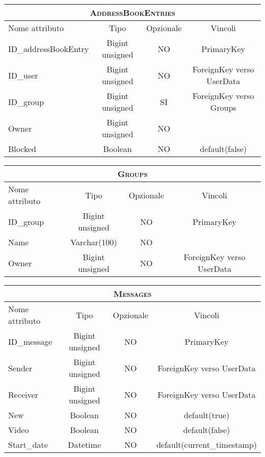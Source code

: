 \begin{center}
\bigskip

\begin{tabular}{lccc}
\toprule
\multicolumn{4}{c}{\scshape\bfseries AddressBookEntries}\\
\midrule
Nome attributo & Tipo & Opzionale & Vincoli\\
\midrule
ID\_addressBookEntry & Bigint unsigned & NO & PrimaryKey\\
ID\_user & Bigint unsigned & NO & ForeignKey verso UserData\\
ID\_group & Bigint unsigned & SI & ForeignKey verso Groups\\
Owner & Bigint unsigned & NO & \\
Blocked & Boolean & NO & default(false)\\
\bottomrule
\end{tabular}

\bigskip

\begin{tabular}{lccc}
\toprule
\multicolumn{4}{c}{\scshape\bfseries Groups}\\
\midrule
Nome attributo & Tipo & Opzionale & Vincoli\\
\midrule
ID\_group & Bigint unsigned & NO & PrimaryKey\\
Name & Varchar(100) & NO & \\
Owner & Bigint unsigned & NO & ForeignKey verso UserData\\
\bottomrule
\end{tabular}

\bigskip

\begin{tabular}{lccc}
\toprule
\multicolumn{4}{c}{\scshape\bfseries Messages}\\
\midrule
Nome attributo & Tipo & Opzionale & Vincoli\\
\midrule
ID\_message & Bigint unsigned & NO & PrimaryKey\\
Sender & Bigint unsigned & NO & ForeignKey verso UserData \\
Receiver & Bigint unsigned & NO & ForeignKey verso UserData\\
New & Boolean & NO & default(true)\\
Video & Boolean & NO & default(false)\\
Start\_date & Datetime & NO & default(current\_timestamp)\\
\bottomrule
\end{tabular}

\end{center}


